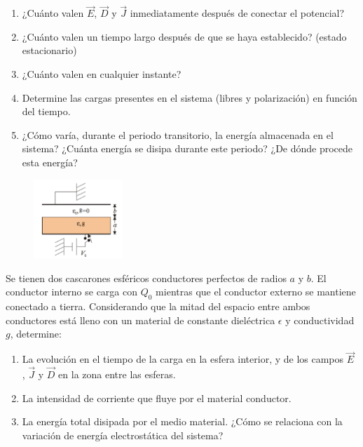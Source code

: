 \begin{enumerate}[label=\alph*)]
    \item ¿Cuánto valen $\Vec{E}$, $\Vec{D}$ y $\Vec{J}$ inmediatamente después de conectar el potencial?
    \item ¿Cuánto valen un tiempo largo después de que se haya establecido? (estado estacionario)
    \item ¿Cuánto valen en cualquier instante?
    \item Determine las cargas presentes en el sistema (libres y polarización) en función del tiempo.
    \item  ¿Cómo varía, durante el periodo transitorio, la energía almacenada en el sistema? ¿Cuánta energía se disipa durante este periodo? ¿De dónde procede esta energía?
\end{enumerate}

\begin{figure}[H]
    \centering
    \includegraphics[width=0.3\textwidth]{Corriente/PlacaP_9_4.png}
\end{figure}

\bigbreak
\np

Se tienen dos cascarones esféricos conductores perfectos de radios $a$ y $b$. El conductor interno se carga con $Q_0$ mientras que el conductor externo se mantiene conectado a tierra. Considerando que la mitad del espacio entre ambos conductores está lleno con un material de constante dieléctrica $\epsilon$ y conductividad $g$, determine:

\begin{enumerate}[label=\alph*)]
    \item La evolución en el tiempo de la carga en la esfera interior, y de los campos $\Vec{E}$ , $\Vec{J}$ y $\Vec{D}$ en la zona entre las esferas.
    \item La intensidad de corriente que fluye por el material conductor.
    \item  La energía total disipada por el medio material. ¿Cómo se relaciona con la variación de energía electrostática del sistema?
\end{enumerate}


